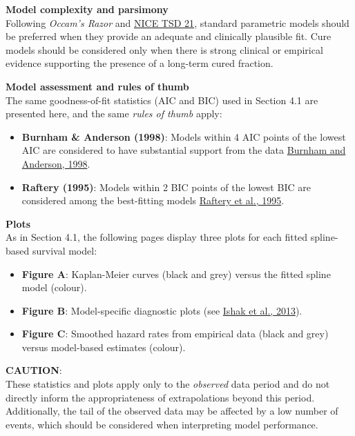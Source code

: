 \documentclass[
]{article}
\providecommand{\tightlist}{%
  \setlength{\itemsep}{0pt}\setlength{\parskip}{0pt}}
\begin{document}
\textbf{Model complexity and parsimony}\\
Following \emph{Occam's Razor} and
\href{https://www.sheffield.ac.uk/media/34188/download?attachment}{NICE
TSD 21}, standard parametric models should be preferred when they
provide an adequate and clinically plausible fit. Cure models should be
considered only when there is strong clinical or empirical evidence
supporting the presence of a long-term cured fraction.

\textbf{Model assessment and rules of thumb}\\
The same goodness-of-fit statistics (AIC and BIC) used in Section 4.1
are presented here, and the same \emph{rules of thumb} apply:

\begin{itemize}
\tightlist
\item
  \textbf{Burnham \& Anderson (1998)}: Models within 4 AIC points of the
  lowest AIC are considered to have substantial support from the data
  \href{https://doi.org/10.1007/978-1-4757-2917-7}{Burnham and Anderson,
  1998}.\\
\item
  \textbf{Raftery (1995)}: Models within 2 BIC points of the lowest BIC
  are considered among the best-fitting models
  \href{https://doi.org/10.2307/271063}{Raftery et al., 1995}.
\end{itemize}

\textbf{Plots}\\
As in Section 4.1, the following pages display three plots for each
fitted spline-based survival model:

\begin{itemize}
\tightlist
\item
  \textbf{Figure A}: Kaplan-Meier curves (black and grey) versus the
  fitted spline model (colour).\\
\item
  \textbf{Figure B}: Model-specific diagnostic plots (see
  \href{https://doi.org/10.1007/s40273-013-0064-3}{Ishak et al.,
  2013}).\\
\item
  \textbf{Figure C}: Smoothed hazard rates from empirical data (black
  and grey) versus model-based estimates (colour).
\end{itemize}

\textbf{CAUTION}:\\
These statistics and plots apply only to the \emph{observed} data period
and do not directly inform the appropriateness of extrapolations beyond
this period.\\
Additionally, the tail of the observed data may be affected by a low
number of events, which should be considered when interpreting model
performance.
\end{document}
